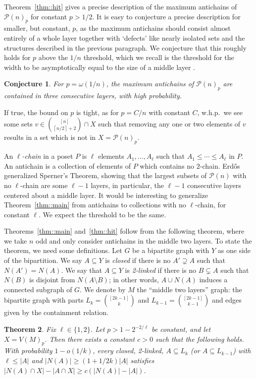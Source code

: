 \documentclass[12pt]{article}
\renewcommand{\P}{\mathcal{P}}
\newcommand{\ceil}[1]{\left\lceil#1\right\rceil}
\newtheorem{theorem}{Theorem}
\newtheorem{conjecture}[theorem]{Conjecture}
\begin{document}
Theorem~\ref{thm::hit} gives a precise description of the maximum antichains of $\P(n)_p$ for constant $p>1/2$. It is easy to conjecture a precise description for smaller, but constant, $p$, as the maximum antichains should consist almost entirely of a whole layer together with `defects' like nearly isolated sets and the structures described in the previous paragraph. We conjecture that this roughly holds for $p$ above the $1/n$ threshold, which we recall is the threshold for the width to be asymptotically equal to the size of a middle layer \cite{BMT,CNM}.
\begin{conjecture}\label{conj::main}
For $p = \omega(1/n)$, the maximum antichains of $\P(n)_p$ are contained in three consecutive layers, with high probability.
\end{conjecture}
If true, the bound on $p$ is tight, as for $p = C/n$ with constant $C$, w.h.p.\ we see some sets $v \in \binom{[n]}{\ceil{n/2}+2} \cap X$ such that removing any one or two elements of $v$ results in a set which is not in $X = \P(n)_p$.

An \emph{$\ell$-chain} in a poset $P$ is $\ell$ elements $A_1, \dots, A_\ell$ such that $A_1 \leq \cdots \leq A_\ell$ in $P$. An antichain is a collection of elements of $P$ which contains no $2$-chain. Erd\H{o}s~\cite{Erdos} generalized Sperner's Theorem, showing that the largest subsets of $\P(n)$ with no $\ell$-chain are some $\ell-1$ layers, in particular, the $\ell-1$ consecutive layers centered about a middle layer. It would be interesting to generalize Theorem~\ref{thm::main} from antichains to collections with no $\ell$-chain, for constant $\ell$. We expect the threshold to be the same.

Theorems~\ref{thm::main} and~\ref{thm::hit} follow from the following theorem, where we take $n$ odd and only consider antichains in the middle two layers. To state the theorem, we need some definitions. Let $G$ be a bipartite graph with $Y$ as one side of the bipartition. We say $A \subseteq Y$ is \emph{closed} if there is no $A' \supsetneq A$ such that $N(A') = N(A)$. We say that $A \subseteq Y$ is \emph{2-linked} if there is no $B \subsetneq A$ such that $N(B)$ is disjoint from $N(A \setminus B)$; in other words, $A \cup N(A)$ induces a connected subgraph of $G$. We denote by $M$ the ``middle two layers'' graph: the bipartite graph with parts $L_k = \binom{[2k-1]}{k}$ and $L_{k-1} = \binom{[2k-1]}{k-1}$ and edges given by the containment relation.

\begin{theorem}\label{thm::2-layers}
Fix $\ell \in \{1,2\}$. Let $p > 1-2^{-2/\ell}$ be constant, and let $X = V(M)_p$. Then there exists a constant $c>0$ such that the following holds. With probability $1-o(1/k)$, every closed, 2-linked, $A \subseteq L_k$ (or $A \subseteq L_{k-1}$) with $\ell \leq |A|$ and $|N(A)| \geq (1+1/2k) |A|$ satisfies $|N(A) \cap X| - |A \cap X| \geq c(|N(A)|-|A|)$.
\end{theorem}
\end{document}
